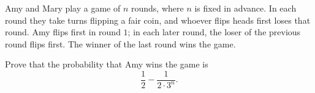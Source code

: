 Amy and Mary play a game of $n$ rounds, where $n$ is fixed in advance. In each round they take turns flipping a fair coin, and whoever flips heads first loses that round. Amy flips first in round $1$; in each later round, the loser of the previous round flips first. The winner of the last round wins the game.

Prove that the probability that Amy wins the game is
\[\dfrac12-\dfrac{1}{2\cdot3^n}.\]
